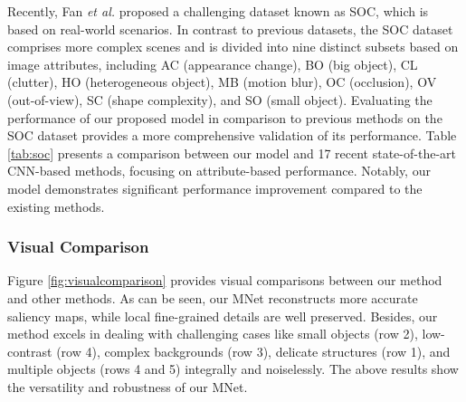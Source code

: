 \documentclass[lettersize,journal]{IEEEtran}
\begin{document}
Recently, Fan \textit{et al.} proposed a challenging dataset known as SOC\cite{fan2022salient}, which is based on real-world scenarios. In contrast to previous datasets, the SOC dataset comprises more complex scenes and is divided into nine distinct subsets based on image attributes, including AC (appearance change), BO (big object), CL (clutter), HO (heterogeneous object), MB (motion blur), OC (occlusion), OV (out-of-view), SC (shape complexity), and SO (small object). 
Evaluating the performance of our proposed model in comparison to previous methods on the SOC dataset provides a more comprehensive validation of its performance. 
Table \ref{tab:soc} presents a comparison between our model and 17 recent state-of-the-art CNN-based methods, focusing on attribute-based performance. 
Notably, our model demonstrates significant performance improvement compared to the existing methods. 

\subsubsection{Visual Comparison}
Figure \ref{fig:visualcomparison} provides visual comparisons between our method and other methods. As can be seen, our MNet reconstructs more accurate saliency maps, while local fine-grained details are well preserved. Besides, our method excels in dealing with challenging cases like small objects (row 2), low-contrast (row 4), complex backgrounds (row 3), delicate structures (row 1), and multiple objects (rows 4 and 5) integrally and noiselessly. The above results show the versatility and robustness of our MNet.
\end{document}
